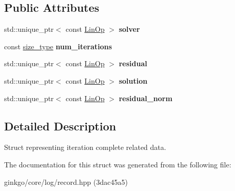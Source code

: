 \subsection*{Public Attributes}
\begin{DoxyCompactItemize}
\item 
\mbox{\label{structgko_1_1log_1_1iteration__complete__data_af485c2d5eff3114076e057b9870106a8}} 
std\+::unique\+\_\+ptr$<$ const \hyperlink{classgko_1_1LinOp}{Lin\+Op} $>$ {\bfseries solver}
\item 
\mbox{\label{structgko_1_1log_1_1iteration__complete__data_a8d5fd7bf89def95a904e95b3f0848594}} 
const \hyperlink{namespacegko_a6e5c95df0ae4e47aab2f604a22d98ee7}{size\+\_\+type} {\bfseries num\+\_\+iterations}
\item 
\mbox{\label{structgko_1_1log_1_1iteration__complete__data_a52473dac8d5ac7849b6dbd7523cdeb37}} 
std\+::unique\+\_\+ptr$<$ const \hyperlink{classgko_1_1LinOp}{Lin\+Op} $>$ {\bfseries residual}
\item 
\mbox{\label{structgko_1_1log_1_1iteration__complete__data_a232f312a1a4c2f8817e208ec2013c454}} 
std\+::unique\+\_\+ptr$<$ const \hyperlink{classgko_1_1LinOp}{Lin\+Op} $>$ {\bfseries solution}
\item 
\mbox{\label{structgko_1_1log_1_1iteration__complete__data_a26a787138ac7faeced0420c5d02371cb}} 
std\+::unique\+\_\+ptr$<$ const \hyperlink{classgko_1_1LinOp}{Lin\+Op} $>$ {\bfseries residual\+\_\+norm}
\end{DoxyCompactItemize}


\subsection{Detailed Description}
Struct representing iteration complete related data. 

The documentation for this struct was generated from the following file\+:\begin{DoxyCompactItemize}
\item 
ginkgo/core/log/record.\+hpp (3dac45a5)\end{DoxyCompactItemize}
